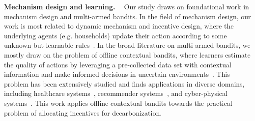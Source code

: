 \noindent\textbf{Mechanism design and learning. \ }
Our study draws on foundational work in mechanism design and multi-armed bandits.  In the field of mechanism design, our work is most related to dynamic mechanism and incentive design, where the underlying agents (e.g. households) update their action according to some unknown but learnable rules~\cite{Parkes2010, Cai2013, Pothineni2014, Pavan2014, Ratliff2019, Bergemann2019, Ratliff2021}.  
In the broad literature on multi-armed bandits, we mostly draw on the problem of offline contextual bandits, where learners estimate the quality of actions by leveraging a pre-collected data set with contextual information and make informed decisions in uncertain environments~\cite{auer2002nonstochastic,li2010contextual,slivkins2011contextual,agarwal2014taming,foster2018practical,jin2021pessimism,li2022pessimism,rashidinejad2022bridging}. 
This problem has been extensively studied and finds applications in diverse domains, including healthcare systems~\cite{durand2018contextual,bastani2020online}, recommender systems~\cite{li2010contextual,bouneffouf2012contextual}, and cyber-physical systems~\cite{li2016contextual,wu2019context}.
This work applies offline contextual bandits towards the practical problem of allocating incentives for decarbonization.

\vspace{-0.15cm}